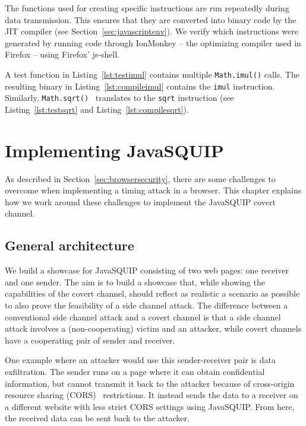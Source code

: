 \documentclass[11pt,
  titlepage=false,
  parskip=half,      %
]{scrreprt}
\begin{document}
The functions used for creating specific instructions are run repeatedly during data transmission.
This ensures that they are converted into binary code by the JIT compiler (see Section~\ref{sec:javascriptenv}).
We verify which instructions were generated by running code through IonMonkey -- the optimizing compiler used in Firefox --
using Firefox' js-shell.

A test function in Listing~\ref{lst:testimul} contains multiple \texttt{Math.imul()} calls.
The resulting binary in Listing~\ref{lst:compileimul} contains the \texttt{imul} instruction.
Similarly, \texttt{Math.sqrt()}~\cite{mathsqrt} translates to the \texttt{sqrt} instruction (see Listing~\ref{lst:testsqrt} and Listing~\ref{lst:compilesqrt}).

\chapter{Implementing JavaSQUIP}
\label{ch:implementation}
As described in Section~\ref{sec:browsersecurity}, there are some challenges to overcome when implementing a timing attack in a browser.
This chapter explains how we work around these challenges to implement the JavaSQUIP covert channel.

\section{General architecture}
\label{sec:general-architecture}
We build a showcase for JavaSQUIP consisting of two web pages: one receiver and one sender.
The aim is to build a showcase that, while showing the capabilities of the covert channel,
should reflect as realistic a scenario as possible to also prove the feasibility of a side channel attack.
The difference between a conventional side channel attack and a covert channel is that a side channel attack involves a (non-cooperating) victim and
an attacker, while covert channels have a cooperating pair of sender and receiver.

One example where an attacker would use this sender-receiver pair is data exfiltration.
The sender runs on a page where it can obtain confidential information,
but cannot transmit it back to the attacker because of cross-origin resource sharing (CORS)~\cite{cors} restrictions.
It instead sends the data to a receiver on a different website with less strict CORS settings using JavaSQUIP.
From here, the received data can be sent back to the attacker.
\end{document}
